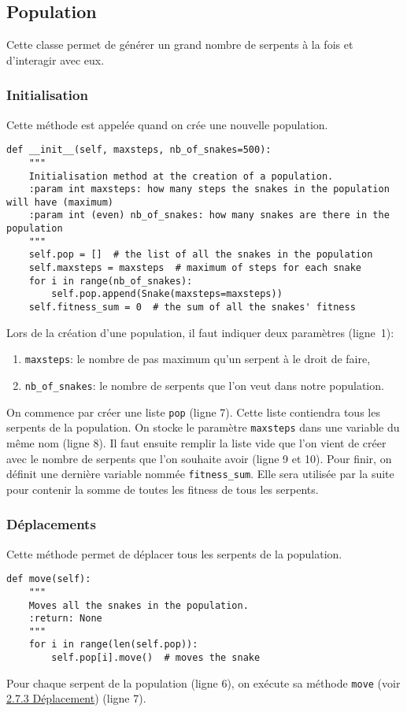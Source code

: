 \documentclass[12pt, a4paper, openany]{book}
\begin{document}
\subsection{Population}
Cette classe permet de générer un grand nombre de serpents à la fois et d'interagir avec eux.

\subsubsection{Initialisation}
\label{r:2.7.6-ini}
Cette méthode est appelée quand on crée une nouvelle population.\newpage
\begin{verbatim}
def __init__(self, maxsteps, nb_of_snakes=500):
    """
    Initialisation method at the creation of a population.
    :param int maxsteps: how many steps the snakes in the population will have (maximum)
    :param int (even) nb_of_snakes: how many snakes are there in the population
    """
    self.pop = []  # the list of all the snakes in the population
    self.maxsteps = maxsteps  # maximum of steps for each snake
    for i in range(nb_of_snakes):
        self.pop.append(Snake(maxsteps=maxsteps))
    self.fitness_sum = 0  # the sum of all the snakes' fitness
\end{verbatim}
Lors de la création d'une population, il faut indiquer deux paramètres (ligne~1):
\begin{enumerate}
	\item \verb'maxsteps': le nombre de pas maximum qu'un serpent à le droit de faire,
	\item \verb'nb_of_snakes': le nombre de serpents que l'on veut dans notre population.
\end{enumerate}
On commence par créer une liste \verb'pop' (ligne 7). Cette liste contiendra tous les serpents de la population. On stocke le paramètre \verb'maxsteps' dans une variable du même nom (ligne 8). Il faut ensuite remplir la liste vide que l'on vient de créer avec le nombre de serpents que l'on souhaite avoir (ligne 9 et 10). Pour finir, on définit une dernière variable nommée \verb'fitness_sum'. Elle sera utilisée par la suite pour contenir la somme de toutes les fitness de tous les serpents.

\subsubsection{Déplacements}
Cette méthode permet de déplacer tous les serpents de la population.
\begin{verbatim}
def move(self):
    """
    Moves all the snakes in the population.
    :return: None
    """
    for i in range(len(self.pop)):
        self.pop[i].move()  # moves the snake
\end{verbatim}
Pour chaque serpent de la population (ligne 6), on exécute sa méthode \verb'move' (voir \hyperref[r:2.7.3-dep]{2.7.3 Déplacement}) (ligne 7).
\end{document}
